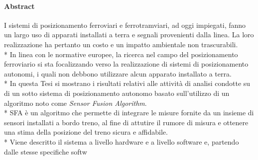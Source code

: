 \paragraph{Abstract}
I sistemi di posizionamento ferroviari e ferrotramviari, ad oggi impiegati, fanno un largo uso di apparati installati a terra e segnali provenienti dalla linea. La loro realizzazione ha pertanto un costo e un impatto ambientale non trascurabili.\\*
In linea con le normative europee, la ricerca nel campo del posizionamento ferroviario si sta focalizzando verso la realizzazione di sistemi di posizionamento autonomi, i quali non debbono utilizzare alcun apparato installato a terra.\\*
In questa Tesi si mostrano i risultati relativi alle attivit\`a di analisi condotte su di un sotto sistema di posizionamento autonomo basato sull'utilizzo di un algoritmo noto come \emph{Sensor Fusion Algorithm}.\\*
SFA \`e un algoritmo che permette di integrare le misure fornite da un insieme di sensori installati a bordo treno, al fine di attutire il rumore di misura e ottenere una stima della posizione del treno sicura e affidabile.\\*
Viene descritto il sistema a livello hardware e a livello software e, partendo dalle stesse specifiche softw

